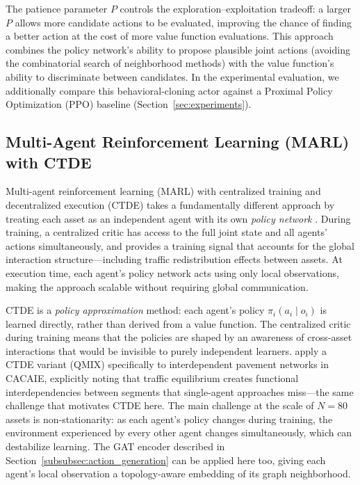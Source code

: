 \documentclass[3p, twocolumn]{elsarticle}
\begin{document}
The patience parameter $P$ controls the exploration--exploitation tradeoff: a larger $P$ allows more candidate actions to be evaluated, improving the chance of finding a better action at the cost of more value function evaluations. This approach combines the policy network's ability to propose plausible joint actions (avoiding the combinatorial search of neighborhood methods) with the value function's ability to discriminate between candidates. In the experimental evaluation, we additionally compare this behavioral-cloning actor against a Proximal Policy Optimization (PPO) baseline (Section~\ref{sec:experiments}).

\subsection{Multi-Agent Reinforcement Learning (MARL) with CTDE}
\label{subsec:MARL}

Multi-agent reinforcement learning (MARL) with centralized training and decentralized execution (CTDE) takes a fundamentally different approach by treating each asset as an independent agent with its own \emph{policy network} \citep{saifullah_multi-agent_2026}. During training, a centralized critic has access to the full joint state and all agents' actions simultaneously, and provides a training signal that accounts for the global interaction structure---including traffic redistribution effects between assets. At execution time, each agent's policy network acts using only local observations, making the approach scalable without requiring global communication.

CTDE is a \emph{policy approximation} method: each agent's policy $\pi_i(a_i \mid o_i)$ is learned directly, rather than derived from a value function. The centralized critic during training means that the policies are shaped by an awareness of cross-asset interactions that would be invisible to purely independent learners. \citet{yao_multi-agent_2024} apply a CTDE variant (QMIX) specifically to interdependent pavement networks in CACAIE, explicitly noting that traffic equilibrium creates functional interdependencies between segments that single-agent approaches miss---the same challenge that motivates CTDE here. The main challenge at the scale of $N = 80$ assets is non-stationarity: as each agent's policy changes during training, the environment experienced by every other agent changes simultaneously, which can destabilize learning. The GAT encoder described in Section~\ref{subsubsec:action_generation} can be applied here too, giving each agent's local observation a topology-aware embedding of its graph neighborhood.
\end{document}
